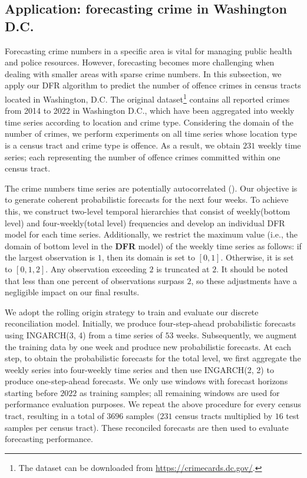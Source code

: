 \documentclass[a4paper,review,12pt,authoryear]{elsarticle}
\begin{document}
     \subsection{Application: forecasting crime in Washington D.C.}
     \label{sec:application_crime}
     
     Forecasting crime numbers in a specific area is vital for managing public health and police resources.
     However, forecasting becomes more challenging when dealing with smaller areas with sparse crime numbers.
     In this subsection, we apply our DFR algorithm to predict the number of offence crimes in census tracts located in Washington, D.C. 
     The original dataset\footnote{The dataset can be downloaded from \url{https://crimecards.dc.gov/}.} contains all reported crimes from 2014 to 2022 in Washington D.C., which have been aggregated into weekly time series according to location and crime type. 
     Considering the domain of the number of crimes, we perform experiments on all time series whose location type is a census tract and crime type is offence.
     As a result, we obtain $231$ weekly time series; each representing the number of offence crimes committed within one census tract.
     
     The crime numbers time series are potentially autocorrelated (\citealp{aldor-noimanSpatioTemporalLowCount2013}). 
     Our objective is to generate coherent probabilistic forecasts for the next four weeks.
     To achieve this, we construct two-level temporal hierarchies that consist of weekly(bottom level) and four-weekly(total level) frequencies and develop an individual DFR model for each time series.
     Additionally, we restrict the maximum value (i.e., the domain of bottom level in the \textbf{DFR} model) of the weekly time series as follows: if the largest observation is $1$, then its domain is set to $[0, 1]$. 
     Otherwise, it is set to $[0, 1, 2]$. 
     Any observation exceeding $2$ is truncated at $2$. 
     It should be noted that less than one percent of observations surpass $2$, so these adjustments have a negligible impact on our final results.
     
     We adopt the rolling origin strategy to train and evaluate our discrete reconciliation model. 
     Initially, we produce four-step-ahead probabilistic forecasts using INGARCH(3, 4) from a time series of $53$ weeks. 
     Subsequently, we augment the training data by one week and produce new probabilistic forecasts. 
     At each step, to obtain the probabilistic forecasts for the total level, we first aggregate the weekly series into four-weekly time series and then use INGARCH(2, 2) to produce one-step-ahead forecasts.
     We only use windows with forecast horizons starting before $2022$ as training samples; all remaining windows are used for performance evaluation purposes.
     We repeat the above procedure for every census tract, resulting in a total of $3696$ samples ($231$ census tracts multiplied by $16$ test samples per census tract). 
     These reconciled forecasts are then used to evaluate forecasting performance. 
     
\end{document}
